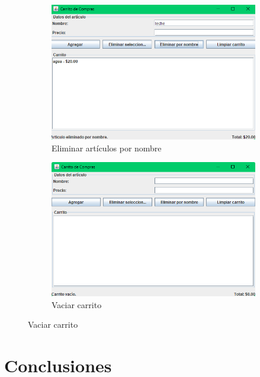 \documentclass[letterpaper,12pt]{article}
\begin{document}
\begin{figure}[H]
    \centering
    \begin{subfigure}{0.45\textwidth}
        \centering
        \includegraphics[width=\linewidth]{Imagenes/nombre.png}
        \caption*{Eliminar artículos por nombre}
    \end{subfigure}
    \hfill
    \begin{subfigure}{0.45\textwidth}
        \centering
        \includegraphics[width=\linewidth]{Imagenes/vaciar.png}
        \caption*{Vaciar carrito}
    \end{subfigure}
\end{figure}

\clearpage

\section{Conclusiones}
\end{document}
